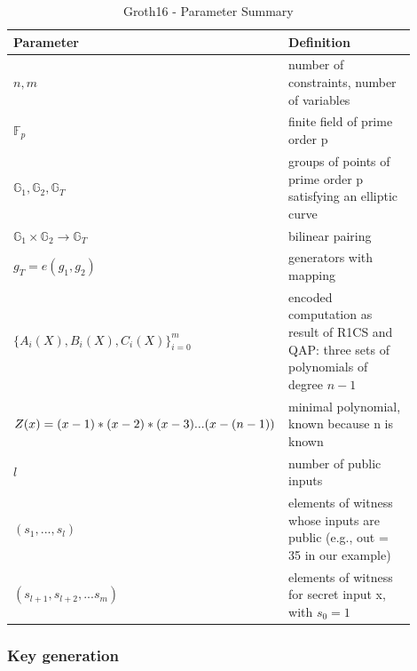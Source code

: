 \setlength{\tabcolsep}{2ex}
\renewcommand{\arraystretch}{1.5}%
\begin{table}[hbt]
	\centering
	    \caption{Groth16 - Parameter Summary}
		\begin{tabular}{| m{0.3\linewidth} | m{0.6\linewidth} |}
		\hline
		\textbf{Parameter} & \textbf{Definition}\\ \hline
            \(n,m\) & number of constraints, number of variables\\ \hline
            \begin{math}\mathbb{F}_p\end{math} & finite field of prime order p\\ \hline 
            \begin{math}\mathbb{G}_1, \mathbb{G}_2, \mathbb{G}_T\end{math} & groups of points of prime order p satisfying an elliptic curve\\ \hline
            \begin{math}\mathbb{G}_1 \times \mathbb{G}_2 \to \mathbb{G}_T\end{math}& bilinear pairing \\ \hline
            \begin{math}g_T = e(g_1, g_2)\end{math}& generators with mapping \\\hline
            \begin{math}\bigl\{A_i(X), B_i(X), C_i(X)\bigl\}_{i=0}^m\end{math} & encoded computation as result of R1CS and QAP: three sets of polynomials of degree \(n-1\)\\ \hline
            \(Z(x) = (x-1)*(x-2) * \newline (x-3)...(x-(n-1))\) &  minimal polynomial, known because n is known \\ \hline
            \(l\) & number of public inputs \\ \hline
            \((s_1,...,s_l)\) & elements of witness whose inputs are public \newline (e.g., out = 35 in our example) \\ \hline
            \((s_{l+1},s_{l+2},...s_m)\) & elements of witness for secret input x, with \(s_0 = 1\) \\ \hline
	\end{tabular}
\label{tab:Groth16Params}
\end{table}

\subsubsection{Key generation}

